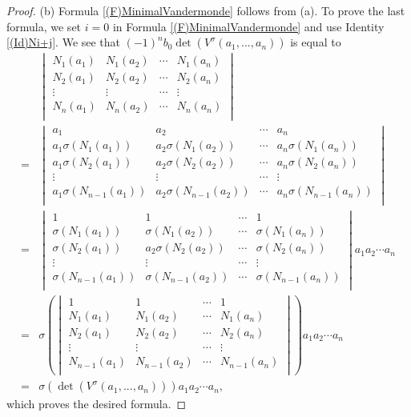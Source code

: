 \documentclass[10pt,a4paper]{amsart}
\newcommand{\s}{\sigma}
\begin{document}
\begin{proof}
	 (b) Formula \ref{(F)MinimalVandermonde} follows from (a). To prove the last formula, we set $i=0$ in Formula \ref{(F)MinimalVandermonde} and use Identity \ref{(Id)Ni+j}. We see that $(-1)^{n}b_0\det \left( V^\s(a_1,...,a_n)\right)$ is equal to
	 \begin{align*}
	 	  & \begin{vmatrix}
	 		N_{1}(a_1)&N_{1}(a_2)&\cdots&N_{1}(a_n)\\
	 		N_{2}(a_1)&N_{2}(a_2)&\cdots&N_{2}(a_n)\\
	 		\vdots&\vdots&\cdots&\vdots\\
	 		N_{n}(a_1)&N_{n}(a_2)&\cdots&N_{n}(a_n)\\
	 	\end{vmatrix}\\
 	=& \begin{vmatrix}
 		a_1&a_2&\cdots&a_n\\
 		a_1\s(N_{1}(a_1))&a_2\s(N_{1}(a_2))&\cdots&a_n\s(N_{1}(a_n))\\
 		a_1\s(N_{2}(a_1))&a_2\s(N_{2}(a_2))&\cdots&a_n\s(N_{2}(a_n))\\
 		\vdots&\vdots&\cdots&\vdots\\
 		a_1\s(N_{n-1}(a_1))&a_2\s(N_{n-1}(a_2))&\cdots&a_n\s(N_{n-1}(a_n))\\
 	\end{vmatrix}\\
 =& \begin{vmatrix}
 	1&1&\cdots&1\\
 	\s(N_{1}(a_1))&\s(N_{1}(a_2))&\cdots&\s(N_{1}(a_n))\\
 	\s(N_{2}(a_1))&a_2\s(N_{2}(a_2))&\cdots&\s(N_{2}(a_n))\\
 	\vdots&\vdots&\cdots&\vdots\\
 	\s(N_{n-1}(a_1))&\s(N_{n-1}(a_2))&\cdots&\s(N_{n-1}(a_n))\\
 \end{vmatrix}a_1a_2\cdots a_n\\
=& \s \left( \begin{vmatrix}
	1&1&\cdots&1\\
	N_{1}(a_1)&N_{1}(a_2)&\cdots&N_{1}(a_n)\\
	N_{2}(a_1)&N_{2}(a_2)&\cdots&N_{2}(a_n)\\
	\vdots&\vdots&\cdots&\vdots\\
	N_{n-1}(a_1)&N_{n-1}(a_2)&\cdots&N_{n-1}(a_n)\\
\end{vmatrix}\right) a_1a_2\cdots a_n\\
=& \s\left( \det \left( V^\s(a_1,...,a_n)\right)\right)  a_1a_2\cdots a_n,
	 \end{align*}
which proves the desired formula. 	 
	 \end{proof}
\end{document}
